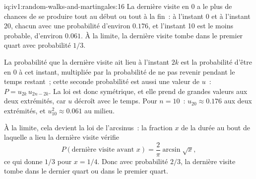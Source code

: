 \begin{solution}{iq:iv1:random-walks-and-martingales:16}
La dernière visite en 0 a le plus de chances de se produire tout au début ou tout à la fin~: à l'instant 0 et à l'instant 20, chacun avec une probabilité d'environ $0.176$, et l'instant 10 est le moins probable, d'environ $0.061$. À la limite, la dernière visite tombe dans le premier quart avec probabilité $1/3$.

La probabilité que la dernière visite ait lieu à l'instant $2k$ est la probabilité d'être en 0 à cet instant, multipliée par la probabilité de ne pas revenir pendant le temps restant~; cette seconde probabilité est aussi une valeur de $u$~: $P = u_{2k}\, u_{2n - 2k}$. La loi est donc symétrique, et elle prend de grandes valeurs aux deux extrémités, car $u$ décroît avec le temps. Pour $n = 10$~: $u_{20} \approx 0.176$ aux deux extrémités, et $u_{10}^2 \approx 0.061$ au milieu.

À la limite, cela devient la loi de l'arcsinus~: la fraction $x$ de la durée au bout de laquelle a lieu la dernière visite vérifie
\[
P(\text{dernière visite avant } x) = \frac{2}{\pi} \arcsin\sqrt{x},
\]
ce qui donne $1/3$ pour $x = 1/4$. Donc avec probabilité $2/3$, la dernière visite tombe dans le dernier quart ou dans le premier quart.

\end{solution}

